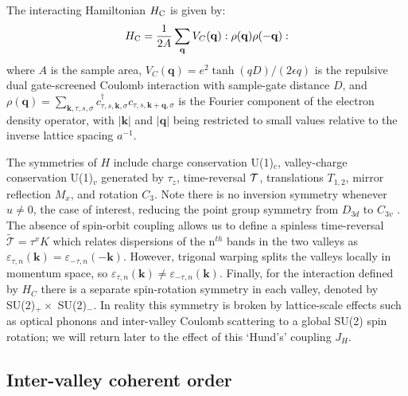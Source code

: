 \documentclass[aps,pra,twocolumn,superscriptaddress,10pt,article,nofootinbib,showpacs,longbibliography]{revtex4-1}
\def \k{{\mathbf k}}
\def \q{{\mathbf q}}
\def \beq{\begin{eqnarray}}
\def \eeq{\end{eqnarray}}
\begin{document}
The interacting Hamiltonian $H_{\rm C}$ is given by:
\beq
H_{\rm C} = \frac{1}{2A} \sum_{\q} V_C(\q) :\rho(\q) \rho(-\q):
\label{eq:HC}
\eeq
where $A$ is the sample area, $V_C(\q) = e^2 \tanh{(q D)}/(2 \epsilon q)$ is the repulsive dual gate-screened Coulomb interaction with sample-gate distance $D$, and $\rho(\q) = \sum_{\k,\tau,s,\sigma} c^\dagger_{\tau,s,\k,\sigma} c_{\tau,s,\k+\q,\sigma}$ is the Fourier component of the electron density operator, with $|\k|$ and $|\q|$ being restricted to small values relative to the inverse lattice spacing $a^{-1}$.

The symmetries of $H$ include charge conservation U(1)$_c$, valley-charge conservation U(1)$_v$ generated by $\tau_z$, time-reversal $\cal{T}$, translations $T_{1,2}$, mirror reflection $M_x$,  and rotation $C_3$.
Note there is no inversion symmetry whenever $u \neq 0$, the case of interest, reducing the point group symmetry from $D_{3d}$ to $C_{3v}$ \cite{Latil,Cvetkovic}.
The absence of spin-orbit coupling allows us to define a spinless time-reversal $\tilde{\mathcal{T}} = \tau^x K$ which relates dispersions of the n$^{th}$ bands in the two valleys as $\varepsilon_{\tau,n}(\k) = \varepsilon_{-\tau,n}(-\k)$. 
However, trigonal warping splits the valleys locally in momentum space, so $\varepsilon_{\tau,n}(\k) \neq \varepsilon_{-\tau,n}(\k)$.
Finally, for the interaction defined by $H_C$ there is a separate spin-rotation symmetry in each valley, denoted by SU(2)$_+ \times$ SU(2)$_-$. In reality this symmetry is broken by lattice-scale effects such as optical phonons and inter-valley Coulomb scattering \cite{CBZ2020} to a global SU(2) spin rotation;  we will return later to the effect of this `Hund's' coupling $J_H$.

\subsection{Inter-valley coherent order}
\label{sec:IVC}
\end{document}

